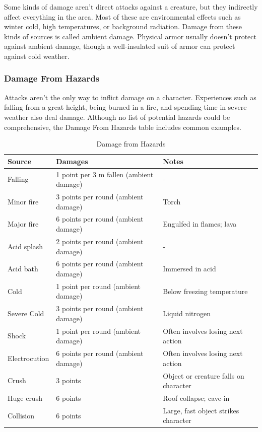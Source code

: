 \begin{multicols}{2}
Some kinds of damage aren’t direct attacks against a creature, but they indirectly affect everything in the area. Most of these are environmental effects such as winter cold, high temperatures, or background radiation. Damage from these kinds of sources is called ambient damage. Physical armor usually doesn’t protect against ambient damage, though a well-insulated suit of armor can protect against cold weather.

\subsubsection{Damage From Hazards}

Attacks aren’t the only way to inflict damage on a character. Experiences such as falling from a great height, being burned in a fire, and spending time in severe weather also deal damage. Although no list of potential hazards could be comprehensive, the Damage From Hazards table includes common examples.

\end{multicols}

\begin{table}[h]
\centering

\caption{Damage from Hazards}
\label{tab:Damage from Hazards}
\begin{tabularx}{\textwidth} { | Y | Y | Y | }
\hline
\textbf{Source} & \textbf{Damages} & \textbf{Notes} \\ \hline
Falling & 1 point per 3 m fallen (ambient damage) & - \\ \hline
Minor fire & 3 points per round (ambient damage) & Torch \\ \hline
Major fire & 6 points per round (ambient damage) & Engulfed in flames; lava \\ \hline
Acid splash & 2 points per round (ambient damage) & - \\ \hline
Acid bath & 6 points per round (ambient damage) & Immersed in acid \\ \hline
Cold & 1 point per round (ambient damage) & Below freezing temperature \\ \hline
Severe Cold & 3 points per round (ambient damage) & Liquid nitrogen \\ \hline
Shock & 1 point per round (ambient damage) & Often involves losing next action \\ \hline
Electrocution & 6 points per round (ambient damage) & Often involves losing next action \\ \hline
Crush & 3 points & Object or creature falls on character \\ \hline
Huge crush & 6 points & Roof collapse; cave-in \\ \hline
Collision & 6 points & Large, fast object strikes character \\ \hline

\end{tabularx}
\end{table}

